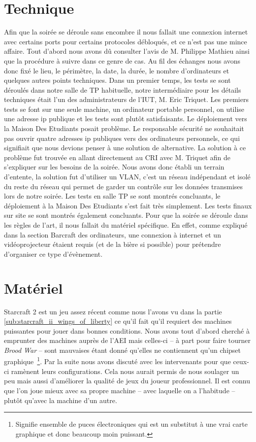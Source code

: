 \section{Technique}%
\label{sec:technique}

Afin que la soirée se déroule sans encombre il nous fallait une connexion
internet avec certains ports pour certains protocoles débloqués, et ce
n'est pas une mince affaire. Tout d'abord nous avons dû consulter l'avis de
M. Philippe Mathieu ainsi que la procédure à suivre dans ce genre de cas. Au fil
des échanges nous avons donc fixé le lieu, le périmètre, la date, la
durée, le nombre d'ordinateurs et quelques autres points techniques.
Dans un premier temps, les tests se sont déroulés dans notre salle de TP
habituelle, notre intermédiaire pour les détails techniques était l'un des
administrateurs de l'IUT, M. Eric Triquet.
Les premiers tests se font sur une seule machine, un ordinateur portable personnel,
on utilise une adresse ip publique et les tests sont plutôt satisfaisants.
Le déploiement vers la Maison Des Etudiants posait problème. Le responsable sécurité ne souhaitait pas ouvrir
quatre adresses ip publiques vers des ordinateurs personnels, ce qui signifiait
que nous devions penser à une solution de alternative. La solution à ce problème fut
trouvée en allant directement au CRI avec M. Triquet afin de
s'expliquer sur les besoins de la soirée. Nous avons donc établi un
terrain d'entente, la solution fut d'utiliser un VLAN, c'est un réseau
indépendant et isolé du reste du réseau qui permet de garder un contrôle
sur les données transmises lors de notre soirée. Les tests en salle TP
se sont montrés concluants, le déploiement à la Maison Des
Etudiants s'est fait très simplement. Les tests finaux sur site se sont montrés
également concluants.
Pour que la soirée se déroule dans les règles de l'art, il nous fallait
du matériel spécifique. En effet, comme expliqué dans la section
Barcraft des ordinateurs, une connexion à internet et un
vidéoprojecteur étaient requis (et de la bière si possible) pour prétendre d'organiser ce type d'évènement.

\section{Matériel}%
\label{sec:materiel}

Starcraft 2 est un jeu assez récent comme nous l'avons vu dans la
partie \ref{sub:starcraft_ii_wings_of_liberty} ce qu'il fait qu'il requiert des machines puissantes pour jouer
dans bonnes conditions. Nous avons tout d'abord cherché à emprunter des
machines auprès de l'AEI mais celles-ci -- à part pour faire tourner
\emph{Brood
War} -- sont mauvaises étant donné qu'elles ne contiennent qu'un chipset
graphique\, \footnote{Signifie \og ensemble de puces électroniques \fg{}
qui est un substitut à une vrai carte graphique et donc beaucoup moin
puissant.}. Par la suite nous avons discuté avec les
intervenants pour que ceux-ci ramènent leurs configurations. Cela nous
aurait permis de nous soulager un peu mais aussi d'améliorer la qualité
de jeux du joueur professionnel. Il est connu que l'on joue mieux avec sa
propre machine -- avec laquelle on a l'habitude -- plutôt qu'avec la machine d'un
autre.

